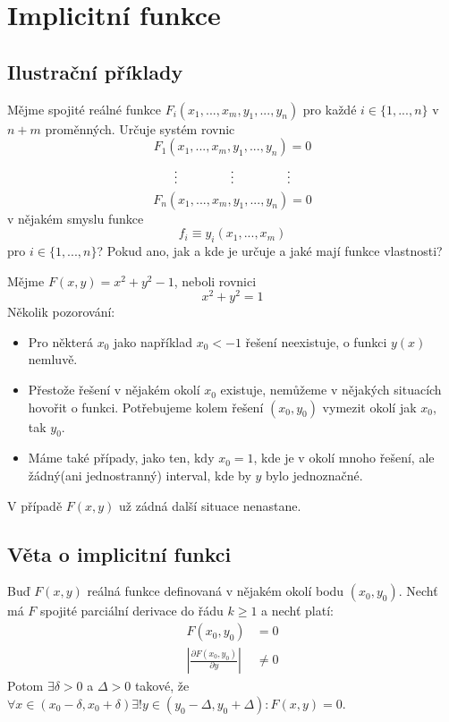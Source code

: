 \documentclass[../main.tex]{subfiles}
\begin{document}
\section{Implicitní funkce}

\subsection{Ilustrační příklady}

\begin{example}[Obecný]
	Mějme spojité reálné funkce $F_i(x_1, ... , x_m, y_1, ... , y_n)$ pro každé $i \in \{1, ..., n\}$
	v $n + m$
	proměnných. Určuje systém rovnic
	\[ F_1(x_1, ... , x_m, y_1, ... , y_n) = 0 \]
	\[ \vdots \hspace{15mm} \vdots \hspace{15mm} \vdots \]
	\[ F_n(x_1, ... , x_m, y_1, ... , y_n) = 0 \]
	v nějakém smyslu funkce
	\[ f_i \equiv y_i(x_1, ... , x_m) \]
	pro $i \in \{ 1, ... , n \}$? Pokud ano, jak a kde je určuje a jaké mají funkce vlastnosti?
\end{example}

\begin{example}[$F(x,y) = x^2 + y^2 - 1$]
	Mějme $F(x,y) = x^2 + y^2 - 1$, neboli rovnici \[ x^2 + y^2 = 1 \]
	Několik pozorování:
	\begin{itemize}
	    \item Pro některá $x_0$ jako například $x_0 < -1$ řešení neexistuje, o funkci $y(x)$ nemluvě.
	    \item Přestože řešení v nějakém okolí $x_0$ existuje, nemůžeme v nějakých situacích hovořit o funkci.
	    Potřebujeme kolem řešení $(x_0, y_0)$ vymezit okolí jak $x_0$, tak $y_0$.
	    \item Máme také případy, jako ten, kdy $x_0 = 1$, kde je v okolí mnoho řešení, ale žádný(ani
	    jednostranný) interval, kde by $y$ bylo jednoznačné.
	\end{itemize}
	V případě $F(x,y)$ už zádná další situace nenastane.
\end{example}

\subsection{Věta o implicitní funkci}
\hspace{1.2mm}
\noindent
Buď $F(x,y)$ reálná funkce definovaná v nějakém okolí bodu $(x_0, y_0)$. Nechť má $F$ spojité parciální
derivace do řádu $k \geq 1$ a nechť platí:
\begin{align*}
    F(x_0, y_0) &= 0\\
    \left| \frac{\partial F(x_0,y_0)}{\partial y} \right| &\neq 0
\end{align*}
Potom $ \exists \delta > 0$ a $\Delta > 0$ takové, že
$\forall x \in (x_0 - \delta , x_0 + \delta) \exists! y \in (y_0 - \Delta , y_0 + \Delta): F(x,y) = 0$.
\end{document}
